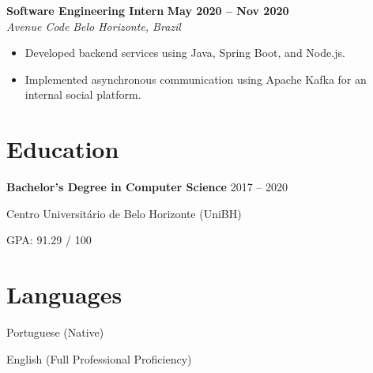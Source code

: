 \documentclass[10pt,a4paper]{article}
\newcommand{\job}[4]{%
    \textbf{#1} \hfill \textbf{#2}\\
    \textit{#3} \hfill \textit{#4}\\[-2pt]
}
\begin{document}

\job{Software Engineering Intern}{May 2020 -- Nov 2020}{Avenue Code}{Belo Horizonte, Brazil}

\begin{itemize}
    \item Developed backend services using Java, Spring Boot, and Node.js.
    \item Implemented asynchronous communication using Apache Kafka for an internal social platform.
\end{itemize}


\section{Education}

\textbf{Bachelor's Degree in Computer Science}
\hfill
2017 -- 2020

Centro Universitário de Belo Horizonte (UniBH)

GPA: 91.29 / 100


\section{Languages}

Portuguese (Native)

English (Full Professional Proficiency)
\end{document}
